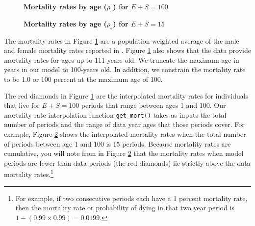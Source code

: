 \documentclass[letterpaper,12pt]{article}
\theoremstyle{definition}
\begin{document}
    \begin{figure}[htbp]\centering \captionsetup{width=4.0in}
      \caption{\label{FigMortRates}\textbf{Mortality rates by age ($\rho_s$) for $E+S=100$}}
    \end{figure}

    \begin{figure}[htbp]\centering \captionsetup{width=4.0in}
      \caption{\label{FigMortRates2}\textbf{Mortality rates by age ($\rho_s$) for $E+S=15$}}
    \end{figure}

    The mortality rates in Figure \ref{FigMortRates} are a population-weighted average of the male and female mortality rates reported in \citet{SocSec:2015}. Figure \ref{FigMortRates} also shows that the data provide mortality rates for ages up to 111-years-old. We truncate the maximum age in years in our model to 100-years old. In addition, we constrain the mortality rate to be 1.0 or 100 percent at the maximum age of 100.

    The red diamonds in Figure \ref{FigMortRates} are the interpolated mortality rates for individuals that live for $E+S=100$ periods that range between ages 1 and 100. Our mortality rate interpolation function \texttt{get\_mort()} takes as inputs the total number of periods and the range of data year ages that those periods cover. For example, Figure \ref{FigMortRates2} shows the interpolated mortality rates when the total number of periods between age 1 and 100 is 15 periods. Because mortality rates are cumulative, you will note from in Figure \ref{FigMortRates2} that the mortality rates when model periods are fewer than data periods (the red diamonds) lie strictly above the data mortality rates.\footnote{For example, if two consecutive periods each have a 1 percent mortality rate, then the mortality rate or probability of dying in that two year period is $1-(0.99 \times 0.99) = 0.0199$.}
\end{document}
